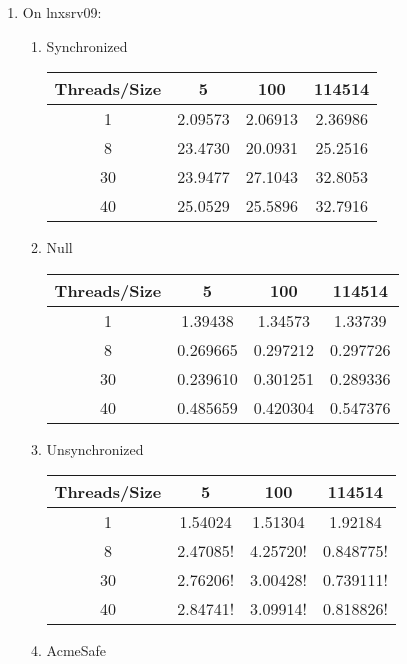 \documentclass[letterpaper,twocolumn,10pt]{article}
\begin{document}
\begin{enumerate}
  \item   
  On lnxsrv09:
  \begin{enumerate}
    \item 
    Synchronized
    \begin{center}
      \begin{tabular}{|c|c|c|c|}
      \hline
        Threads/Size & 5 & 100 & 114514 \\
      \hline 1 & 2.09573 & 2.06913 & 2.36986 \\
      \hline 8 & 23.4730 & 20.0931 & 25.2516 \\
      \hline 30 & 23.9477 & 27.1043 & 32.8053 \\
      \hline 40 & 25.0529 & 25.5896 & 32.7916 \\
      \hline
      \end{tabular}
    \end{center}
    \item 
    Null
    \begin{center}
      \begin{tabular}{|c|c|c|c|}
      \hline
        Threads/Size & 5 & 100 & 114514 \\
      \hline 1 & 1.39438 & 1.34573 & 1.33739 \\
      \hline 8 & 0.269665 & 0.297212 & 0.297726 \\
      \hline 30 & 0.239610 & 0.301251 & 0.289336 \\
      \hline 40 & 0.485659 & 0.420304 & 0.547376 \\
      \hline
      \end{tabular}
    \end{center}
    \item 
    Unsynchronized
    \begin{center}
      \begin{tabular}{|c|c|c|c|}
      \hline
        Threads/Size & 5 & 100 & 114514 \\
      \hline 1 & 1.54024 & 1.51304 & 1.92184 \\
      \hline 8 & 2.47085! & 4.25720! & 0.848775! \\
      \hline 30 & 2.76206! & 3.00428! & 0.739111! \\
      \hline 40 & 2.84741! & 3.09914! & 0.818826! \\
      \hline
      \end{tabular}
    \end{center}
    \item 
    AcmeSafe 
    \begin{center}

\end{center}
\end{enumerate}
\end{enumerate}
\end{document}
